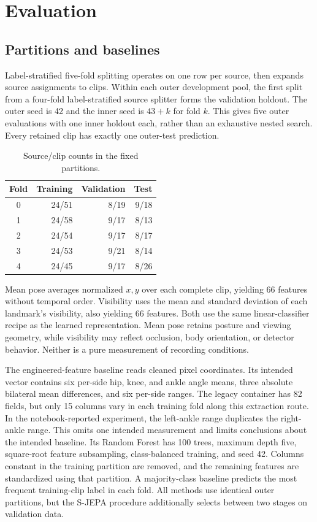 \documentclass[10pt,twocolumn,letterpaper]{article}
\begin{document}
\section{Evaluation}
\subsection{Partitions and baselines}
Label-stratified five-fold splitting operates on one row per source, then expands source assignments to clips. Within each outer development pool, the first split from a four-fold label-stratified source splitter forms the validation holdout. The outer seed is 42 and the inner seed is $43+k$ for fold $k$. This gives five outer evaluations with one inner holdout each, rather than an exhaustive nested search. Every retained clip has exactly one outer-test prediction.

\begin{table}[t]
\centering
\caption{Source/clip counts in the fixed partitions.}
\label{tab:splits}
\begin{tabular}{crrr}
\toprule
Fold & Training & Validation & Test\\
\midrule
0&24/51&8/19&9/18\\
1&24/58&9/17&8/13\\
2&24/54&9/17&8/17\\
3&24/53&9/21&8/14\\
4&24/45&9/17&8/26\\
\bottomrule
\end{tabular}
\end{table}

Mean pose averages normalized $x,y$ over each complete clip, yielding 66 features without temporal order. Visibility uses the mean and standard deviation of each landmark's visibility, also yielding 66 features. Both use the same linear-classifier recipe as the learned representation. Mean pose retains posture and viewing geometry, while visibility may reflect occlusion, body orientation, or detector behavior. Neither is a pure measurement of recording conditions.

The engineered-feature baseline reads cleaned pixel coordinates. Its intended vector contains six per-side hip, knee, and ankle angle means, three absolute bilateral mean differences, and six per-side ranges. The legacy container has 82 fields, but only 15 columns vary in each training fold along this extraction route. In the notebook-reported experiment, the left-ankle range duplicates the right-ankle range. This omits one intended measurement and limits conclusions about the intended baseline. Its Random Forest has 100 trees, maximum depth five, square-root feature subsampling, class-balanced training, and seed 42. Columns constant in the training partition are removed, and the remaining features are standardized using that partition. A majority-class baseline predicts the most frequent training-clip label in each fold. All methods use identical outer partitions, but the S-JEPA procedure additionally selects between two stages on validation data.
\end{document}
